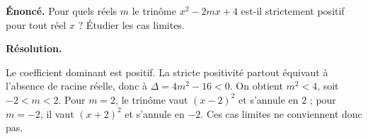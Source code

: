 \documentclass[11pt,a4paper]{article}
\begin{document}
\par\noindent\begin{minipage}{\linewidth}
{\small\color{Muted}\textbf{Énoncé.} Pour quels réels $m$ le trinôme $x^2-2mx+4$ est-il strictement positif pour tout réel $x$ ? Étudier les cas limites.}
\par\medskip
\textbf{Résolution.}\par
Le coefficient dominant est positif. La stricte positivité partout équivaut à l’absence de racine réelle, donc à $\Delta=4m^2-16<0$. On obtient $m^2<4$, soit $-2<m<2$. Pour $m=2$, le trinôme vaut $(x-2)^2$ et s’annule en $2$ ; pour $m=-2$, il vaut $(x+2)^2$ et s’annule en $-2$. Ces cas limites ne conviennent donc pas.
\end{minipage}\par
\end{document}
